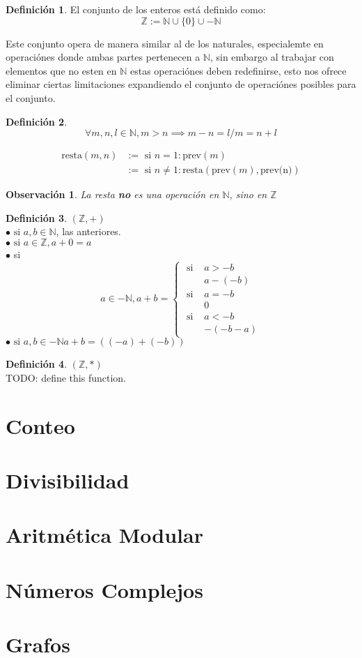 \documentclass[9pt,a4paper]{article}
\theoremstyle{definition}
\newtheorem{defi}{Definición}
\theoremstyle{plain}
\newtheorem{obs}{Observación}
\begin{document}
\begin{defi} El conjunto de los enteros está definido como:\\
$$\mathbb{Z}:= \mathbb{N}\cup{\{0\}\cup{-\mathbb{N}}}$$\end{defi}

Este conjunto opera de manera similar al de los naturales, especialemte en operaciónes donde ambas partes pertenecen a $\mathbb{N}$, sin embargo al trabajar con elementos que no esten en $\mathbb{N}$ estas operaciónes deben redefinirse, esto nos ofrece eliminar ciertas limitaciones expandiendo el conjunto de operaciónes posibles para el conjunto.

\begin{defi} $$\forall{m,n,l}\in{\mathbb{N}}, m>n\implies m-n=l / m=n+l$$

\begin{align*}
\text{resta}(m,n) &:= \text{ si } n=1: \text{prev}(m)\\
                  &:= \text{ si } n\neq{1}: \text{resta}(\text{prev}(m), \text{prev(n)})
\end{align*}
\end{defi}

\begin{obs}La resta {\bfseries no} es una operación en $\mathbb{N}$, sino en $\mathbb{Z}$\end{obs}

\begin{defi}$(\mathbb{Z}, +)$\\
$\bullet \text{ si }a,b\in{\mathbb{N}}$, las anteriores.\\
$\bullet \text{ si }a\in{\mathbb{Z}}, a+0=a$ \\
$\bullet$ si \[a\in{-\mathbb{N}}, a+b=
\begin{cases}
\text{ si } & a>-b\\
&a-(-b)\\
\text{ si } &a=-b\\
&0\\
\text{ si } &a<-b\\
&-(-b-a)
\end{cases}
\]
$\bullet \text{ si }a,b\in{-\mathbb{N}} a+b=((-a)+(-b))$
\end{defi}

\begin{defi} $(\mathbb{Z}, *)$\\
TODO: define this function.
\end{defi}

\part{Conteo}

\part{Divisibilidad}

\part{Aritmética Modular}

\part{Números Complejos}

\part{Grafos}
\end{document}
